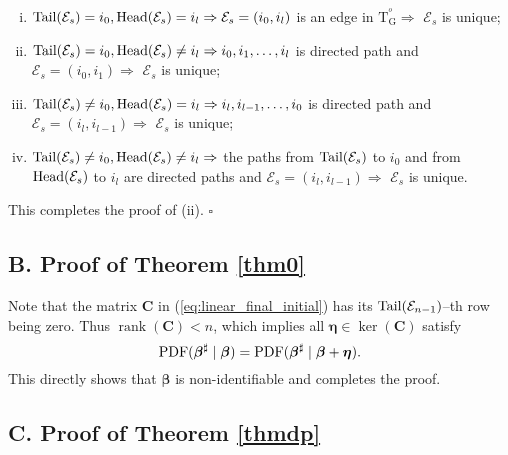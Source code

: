 \documentclass[a4paper, 11pt]{article}
\newcommand{\1}{\mathbf{1}}
\DeclareMathOperator{\rank}{rank}
\newcommand{\asf}{\mathcal{E}}
\newcommand{\etab}{\bm{\eta}}
\newcommand{\Cb}{\mathbf{C}}
\newcommand{\Head}{\textnormal{Head}}
\newcommand{\Tail}{\textnormal{Tail}}
\newcommand{\mG}{\mathrm{G}}
\newcommand{\mT}{\mathrm{T}}
\newcommand{\mTG}{\mT^{^o}_{\mG}}
\newcommand{\betab}{\bm{\beta}}
\begin{document}
\begin{enumerate}[(i)]
	\item $\Tail(\asf_s)=i_0,\Head(\asf_s)=i_l\Rightarrow \asf_s=(i_0,i_l)$ is an edge in $\mTG\Rightarrow$ $\asf_s$ is unique;
	\item $\Tail(\asf_s)=i_0,\Head(\asf_s)\neq i_l\Rightarrow i_0,i_1,\dots,i_l$ is directed path and $\asf_s=(i_0,i_1)\Rightarrow$ $\asf_s$ is unique;
	\item $\Tail(\asf_s)\neq i_0,\Head(\asf_s)= i_l\Rightarrow i_l,i_{l-1},\dots,i_0$ is directed path and $\asf_s=(i_l,i_{l-1})\Rightarrow$ $\asf_s$ is unique;
	\item $\Tail(\asf_s)\neq i_0,\Head(\asf_s)\neq i_l\Rightarrow $ the paths from $\Tail(\asf_s)$ to $i_0$ and from $\Head(\asf_s)$ to $i_l$ are directed paths and $\asf_s=(i_l,i_{l-1})\Rightarrow$ $\asf_s$ is unique.
\end{enumerate}
This completes the proof of (ii). \hfill$\square$





\subsection*{B. Proof of Theorem \ref{thm0}}



Note that the matrix $\Cb$ in (\ref{eq:linear_final_initial}) has its $\Tail(\asf_{n-1 })$--th row being zero. Thus $\rank(\Cb)<n$, which implies all $\etab\in\ker(\Cb)$ satisfy
\begin{equation}\notag
{\rm PDF}(\betab^\sharp\mid\betab)={\rm PDF}(\betab^\sharp\mid\betab+\etab).
\end{equation}
This directly shows that $\betab$ is non-identifiable and completes the proof.



\subsection*{C. Proof of Theorem \ref{thmdp}}
\end{document}
